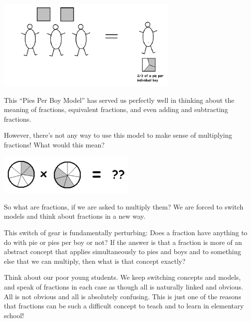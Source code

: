 \documentclass[10pt, reqno]{amsart}
\theoremstyle{remark}
\theoremstyle{definition}
\numberwithin{equation}{section}  %
\begin{document}
   \begin{center}
\includegraphics[height = 4.5cm]{2pies3boys2}
\end{center}


This ``Pies Per Boy Model'' has served us perfectly well in thinking about the meaning of fractions, equivalent fractions, and even adding and subtracting fractions. 

However, there's not any way to use this model to make sense of multiplying fractions!  What would this mean?

   \begin{center}
\includegraphics[height = 2cm]{PPBtimes}
\end{center}

So what are fractions, if we are  asked to multiply them?  We are forced to switch models and think about fractions in a new way.

 This switch of gear is fundamentally perturbing: Does a fraction have anything to do with pie or pies per boy or not? If the answer is that a fraction is more of an abstract concept that applies simultaneously to pies and boys and to something else that we can multiply, then what is that concept exactly? 

Think about our poor young students. We keep switching concepts and models, and speak of fractions in each case as though all is naturally linked and obvious. All is not obvious and all is absolutely confusing.
 This is just one of the reasons that fractions can be such a difficult concept to teach and to learn in elementary school!
\end{document}
